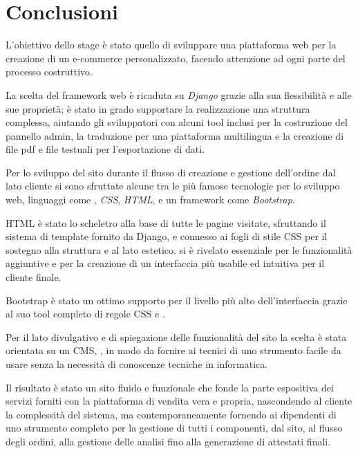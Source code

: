 \chapter*{Conclusioni} 
\label{chp:conclusioni}

L'obiettivo dello stage è stato quello di sviluppare una piattaforma web per la creazione di un e-commerce personalizzato, facendo attenzione ad ogni parte del processo costruttivo.

La scelta del framework web è ricaduta su \emph{Django} grazie alla sua flessibilità e alle sue proprietà; è stato in grado supportare la realizzazione una struttura complessa, aiutando gli sviluppatori con alcuni tool inclusi per la costruzione del pannello admin, la traduzione per una piattaforma multilingua e la creazione di file pdf e file testuali per l'esportazione di dati.

Per lo sviluppo del sito durante il flusso di creazione e gestione dell'ordine dal lato cliente si sono sfruttate alcune tra le più famose tecnologie per lo sviluppo web, linguaggi come \emph{{\js}}, \emph{CSS}, \emph{HTML}, e un framework come \emph{Bootstrap}.

HTML è stato lo scheletro alla base di tutte le pagine visitate, sfruttando il sistema di template fornito da Django, e connesso ai fogli di stile CSS per il sostegno alla struttura e al lato estetico. {\js} si è rivelato essenziale per le funzionalità aggiuntive e per la creazione di un interfaccia più usabile ed intuitiva per il cliente finale.

Bootstrap è stato un ottimo supporto per il livello più alto dell'interfaccia grazie al suo tool completo di regole CSS e {\js}.

Per il lato divulgativo e di spiegazione delle funzionalità del sito la scelta è stata orientata su un CMS, {\wp}, in modo da fornire ai tecnici di {\fem} uno strumento facile da usare senza la necessità di conoscenze tecniche in informatica.

Il risultato è stato un sito fluido e funzionale che fonde la parte espositiva dei servizi forniti con la piattaforma di vendita vera e propria, nascondendo al cliente la complessità del sistema, ma contemporaneamente fornendo ai dipendenti di {\fem} uno strumento completo per la gestione di tutti i componenti, dal sito, al flusso degli ordini, alla gestione delle analisi fino alla generazione di attestati finali.